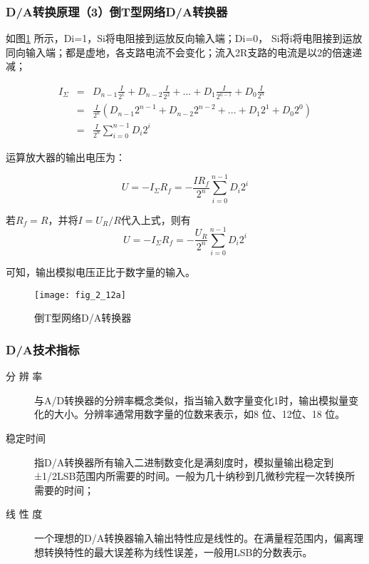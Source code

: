 \subsubsection{D/A转换原理（3）倒T型网络D/A转换器}

如图\ref{fig_2_12a} 所示，Di=1，Si将电阻接到运放反向输入端；Di=0， Si将i将电阻接到运放同向输入端；都是虚地，各支路电流不会变化；流入2R支路的电流是以2的倍速递减；

\begin{eqnarray}
  I_\Sigma &=& D_{n-1}\frac{I}{2^1} +D_{n-2}\frac{I}{2^2}+...+D_{1}\frac{I}{2^{n-1}}+D_{0}\frac{I}{2^{n}}\\
&=&\frac{I}{2^{n}} (D_{n-1}2^{n-1} + D_{n-2}2^{n-2} + ... + D_{1}2^{1} + D_{0}2^{0})\\
&=&\frac{I}{2^{n}}\sum_{i=0}^{n-1} D_i2^i
\end{eqnarray}


运算放大器的输出电压为：

\begin{equation}
  U=-I_\Sigma R_f  =- \frac{IR_f}{2^{n}}\sum_{i=0}^{n-1} D_i2^i
\end{equation}

若$R_f=R$，并将$I=U_R/R$代入上式，则有
\begin{equation}
  U=-I_\Sigma R_f  =- \frac{U_R}{2^{n}}\sum_{i=0}^{n-1} D_i2^i
\end{equation}

可知，输出模拟电压正比于数字量的输入。



\begin{figure}
  \centering
  \texttt{[image: fig\_2\_12a]}
  \caption{倒T型网络D/A转换器}\label{fig_2_12a}
\end{figure}


\subsubsection{D/A技术指标}


\begin{description}
  \item[分 辨 率] 与A/D转换器的分辨率概念类似，指当输入数字量变化1时，输出模拟量变化的大小。分辨率通常用数字量的位数来表示，如8 位、12位、18 位。
  \item[稳定时间] 指D/A转换器所有输入二进制数变化是满刻度时，模拟量输出稳定到±1/2LSB范围内所需要的时间。一般为几十纳秒到几微秒完程一次转换所需要的时间；

  \item[线 性 度] 一个理想的D/A转换器输入输出特性应是线性的。在满量程范围内，偏离理想转换特性的最大误差称为线性误差，一般用LSB的分数表示。
\end{description}




